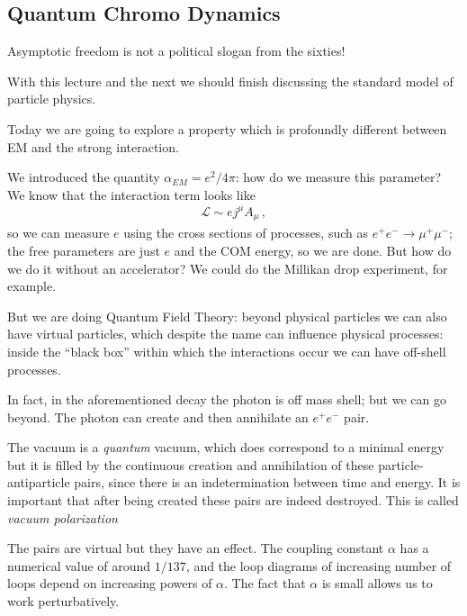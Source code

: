\documentclass[main.tex]{subfiles}
\begin{document}
\subsection{Quantum Chromo Dynamics}


Asymptotic freedom is not a political slogan from the sixties!

With this lecture and the next we should finish discussing the standard model of particle physics. 

Today we are going to explore a property which is profoundly different between EM and the strong interaction. 

We introduced the quantity \(\alpha_{EM} = e^2 / 4 \pi \): how do we measure this parameter?
We know that the interaction term looks like 
%
\begin{align}
\mathscr{L} \sim e j^{\mu }A_{\mu }
\,,
\end{align}
%
so we can measure \(e\) using the cross sections of processes, such as \(e^{+} e^{-} \to \mu^{+} \mu^{-}\); the free parameters are just \(e\) and the COM energy, so we are done. 
But how do we do it without an accelerator? We could do the Millikan drop experiment, for example. 

But we are doing Quantum Field Theory: beyond physical particles we can also have virtual particles, which despite the name can influence physical processes: inside the ``black box'' within which the interactions occur we can have off-shell processes. 

In fact, in the aforementioned decay the photon is off mass shell; but we can go beyond. The photon can create and then annihilate an \(e^{+} e^{-}\) pair. 

The vacuum is a \emph{quantum} vacuum, which does correspond to a minimal energy but it is filled by the continuous creation and annihilation of these particle-antiparticle pairs, since there is an indetermination between time and energy. 
It is important that after being created these pairs are indeed destroyed.
This is called \emph{vacuum polarization}

The pairs are virtual but they have an effect. The coupling constant \(\alpha \) has a numerical value of around \(1 / 137\), and the loop diagrams of increasing number of loops depend on increasing powers of \(\alpha \). 
The fact that \(\alpha \) is small allows us to work perturbatively. 
\end{document}
